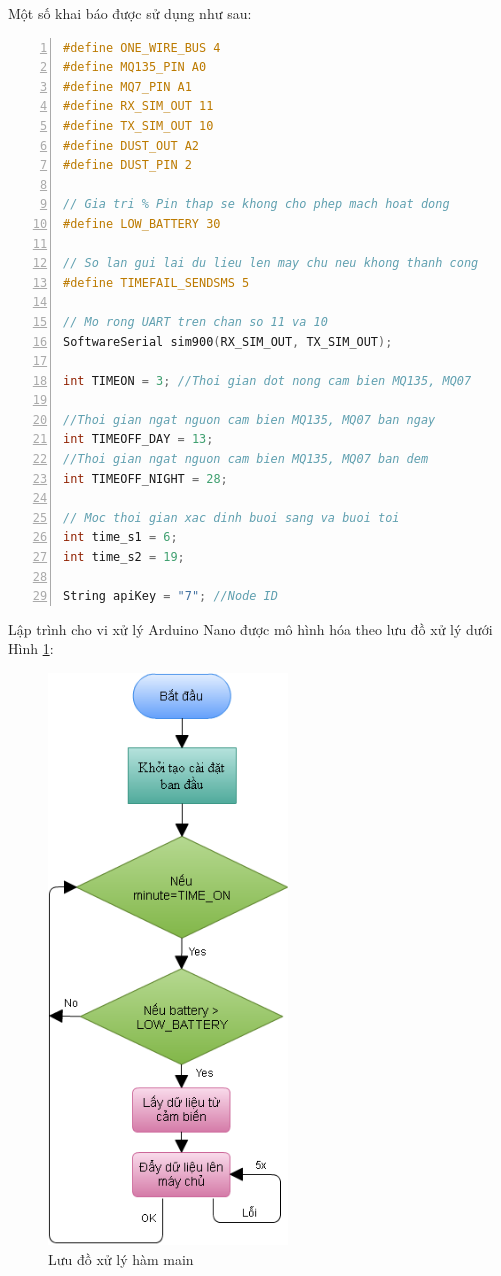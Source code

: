 Một số khai báo được sử dụng như sau:
\begin{lstlisting}[numbers=left,firstnumber=1,language=C]
#define ONE_WIRE_BUS 4
#define MQ135_PIN A0
#define MQ7_PIN A1
#define RX_SIM_OUT 11
#define TX_SIM_OUT 10
#define DUST_OUT A2
#define DUST_PIN 2

// Gia tri % Pin thap se khong cho phep mach hoat dong
#define LOW_BATTERY 30 

// So lan gui lai du lieu len may chu neu khong thanh cong
#define TIMEFAIL_SENDSMS 5 

// Mo rong UART tren chan so 11 va 10
SoftwareSerial sim900(RX_SIM_OUT, TX_SIM_OUT);

int TIMEON = 3; //Thoi gian dot nong cam bien MQ135, MQ07

//Thoi gian ngat nguon cam bien MQ135, MQ07 ban ngay
int TIMEOFF_DAY = 13; 
//Thoi gian ngat nguon cam bien MQ135, MQ07 ban dem
int TIMEOFF_NIGHT = 28;

// Moc thoi gian xac dinh buoi sang va buoi toi
int time_s1 = 6;
int time_s2 = 19;

String apiKey = "7"; //Node ID
\end{lstlisting}
Lập trình cho vi xử lý Arduino Nano được mô hình hóa theo lưu đồ xử lý dưới Hình \ref{fig:node_status}:

\begin{figure}[H]
\centering    
\includegraphics[width=2.5in]{node_status}
\caption[Lưu đồ xử lý hàm main]{Lưu đồ xử lý hàm main}
\label{fig:node_status}
\end{figure}

